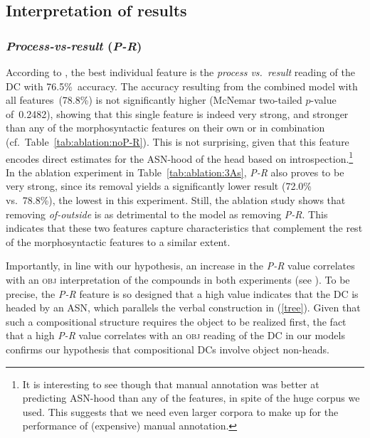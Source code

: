 \documentclass[output=paper]{langsci/langscibook}
\begin{document}
\subsection{Interpretation of results}\label{sec:gia:discussion-int}


\subsubsection{\textit{Process-vs-result} (\textit{P-R})}\label{sec:gia:discussion-int-P-R}
According to , the best individual feature is the \textit{process vs.\ result} reading of the DC with 76.5\%~accuracy. 
The accuracy resulting from the combined model with all features~(78.8\%) is not significantly higher (McNemar two-tailed $p$-value of~0.2482), showing that this single feature is indeed very strong, and stronger than any of the morphosyntactic features on their own or in combination  {(cf.~Table~\ref{tab:ablation:noP-R})}. This is not surprising, given that this feature encodes direct estimates for the ASN-hood of the head based on introspection.\footnote{It is interesting to see though that manual annotation was better at predicting ASN-hood than any of the features, in spite of the huge corpus we used. This suggests that we need even larger corpora to make up for the performance of (expensive) manual annotation.} In the ablation experiment  in Table~\ref{tab:ablation:3As}, \textit{P-R} also proves to be very strong, since its removal yields a significantly lower result ({72.0}\% vs.~78.8\%), the lowest  in this experiment. Still, the ablation study shows that removing \textit{of-outside} is as detrimental to the model as removing \textit{P-R}. This indicates that these two features capture characteristics that complement the rest of the morphosyntactic features to a similar extent.

Importantly, in line with our hypothesis, an increase in the \textit{P-R} value correlates with an \textsc{obj} interpretation of the compounds in both experiments (see  ).  To be precise, the \textit{P-R} feature is so designed that a high value indicates that the DC is headed by an ASN, which parallels  the verbal construction in (\ref{tree}). Given that such a compositional structure requires the object to be realized first, the fact that a high \textit{P-R} value correlates with an \textsc{obj} reading of the DC in our models confirms our hypothesis that compositional DCs involve object non-heads.
\end{document}
